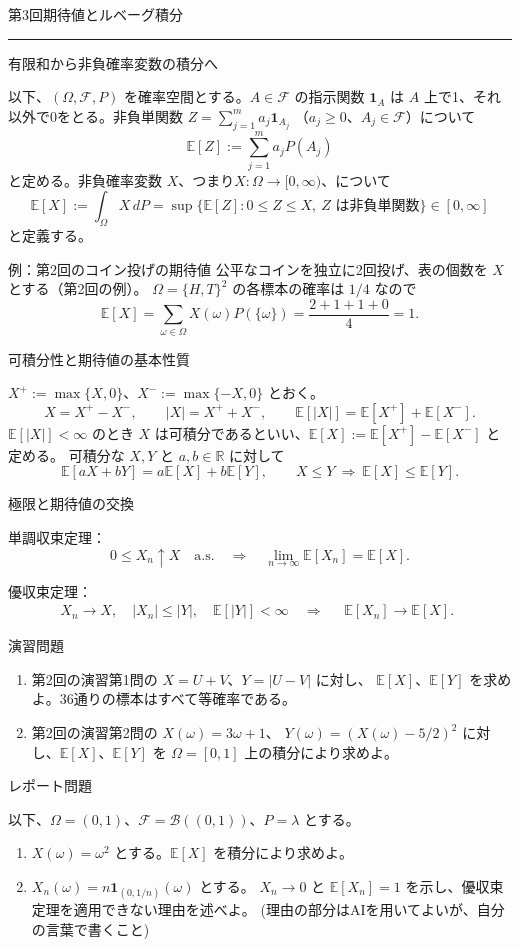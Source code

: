 \documentclass[a4paper,10pt,pdflatex,ja=standard,jafont=ipaex-type1,
  magstyle=real,scale=1]{bxjsarticle}
\newcommand{\lecturenumber}{2}
\newcommand{\topic}[1]{\par\vspace{5pt}
  {\large\sffamily\mdseries\color{accent}#1}\par\vspace{2pt}}
\newcommand{\handouttitle}[1]{%
  \begin{center}
    {\Large\color{ink}#1}\par\vspace{3mm}
    {\color{accent}\rule{0.88\linewidth}{0.7pt}}
  \end{center}\vspace{-2mm}}
\newcommand{\examplelabel}[1]{{\sffamily\mdseries\color{ink}#1}}
\newcommand{\F}{\mathcal F}
\newcommand{\R}{\mathbb R}
\newcommand{\E}{\mathbb E}
\begin{document}
\newpage
\renewcommand{\lecturenumber}{3}
\handouttitle{第3回\quad 期待値とルベーグ積分}

\topic{有限和から非負確率変数の積分へ}
以下、$(\Omega,\F,P)$ を確率空間とする。$A\in\F$ の指示関数 $\mathbf{1}_A$ は
$A$ 上で1、それ以外で0をとる。非負単関数 $Z=\sum_{j=1}^m a_j\mathbf{1}_{A_j}$
（$a_j\ge0$、$A_j\in\F$）について
$$
  \E[Z]:=\sum_{j=1}^m a_jP(A_j)
$$
と定める。非負確率変数 $X$、つまり$X:\Omega\to [0,\infty)$、について
$$
  \E[X]:=\int_\Omega X\,dP
  =\sup\{\E[Z]:0\le Z\le X,\ Z\text{ は非負単関数}\}\in[0,\infty]
$$
と定義する。

\examplelabel{例：第2回のコイン投げの期待値}
公平なコインを独立に2回投げ、表の個数を $X$ とする（第2回の例）。
$\Omega=\{H,T\}^2$ の各標本の確率は $1/4$ なので
$$
  \E[X]=\sum_{\omega\in\Omega}X(\omega)P(\{\omega\})
  =\frac{2+1+1+0}{4}=1.
$$

\topic{可積分性と期待値の基本性質}
$X^+:=\max\{X,0\}$、$X^-:=\max\{-X,0\}$ とおく。
$$
  X=X^+-X^-,\qquad |X|=X^++X^-,\qquad
  \E[|X|]=\E[X^+]+\E[X^-].
$$
$\E[|X|]<\infty$ のとき $X$ は可積分であるといい、$\E[X]:=\E[X^+]-\E[X^-]$ と定める。
可積分な $X,Y$ と $a,b\in\R$ に対して
$$
  \E[aX+bY]=a\E[X]+b\E[Y],\qquad
  X\le Y\ \Longrightarrow\ \E[X]\le\E[Y].
$$

\topic{極限と期待値の交換}
\begingroup
\setlength{\abovedisplayskip}{3pt}
\setlength{\belowdisplayskip}{3pt}
\setlength{\abovedisplayshortskip}{3pt}
\setlength{\belowdisplayshortskip}{3pt}
\examplelabel{単調収束定理：}
$$
  0\le X_n\uparrow X\quad\text{a.s.}
  \quad\Longrightarrow\quad
  \lim_{n\to \infty}\E[X_n] = \E[X].
$$

\examplelabel{優収束定理：}
$$
    X_n\to X,\quad |X_n|\le |Y|,\quad\E[|Y|]<\infty
  \quad\Longrightarrow\quad
  \begin{gathered}
    \E[X_n]\to\E[X].
  \end{gathered}
$$
\par\endgroup

\topic{演習問題}
\begin{enumerate}[label=\arabic*.]
  \item 第2回の演習第1問の $X=U+V$、$Y=|U-V|$ に対し、
  $\E[X]$、$\E[Y]$ を求めよ。36通りの標本はすべて等確率である。
  \item 第2回の演習第2問の $X(\omega)=3\omega+1$、
  $Y(\omega)=(X(\omega)-5/2)^2$ に対し、$\E[X]$、$\E[Y]$ を
  $\Omega=[0,1]$ 上の積分により求めよ。
\end{enumerate}

\topic{レポート問題}
以下、$\Omega=(0,1)$、$\F=\mathcal B((0,1))$、$P=\lambda$ とする。
\begin{enumerate}[label=\arabic*.]
  \item $X(\omega)=\omega^2$ とする。$\E[X]$ を積分により求めよ。
  \item $X_n(\omega)=n\mathbf{1}_{(0,1/n)}(\omega)$ とする。
  $X_n\to0$ と $\E[X_n]=1$ を示し、優収束定理を適用できない理由を述べよ。 (理由の部分はAIを用いてよいが、自分の言葉で書くこと)
\end{enumerate}
\end{document}
